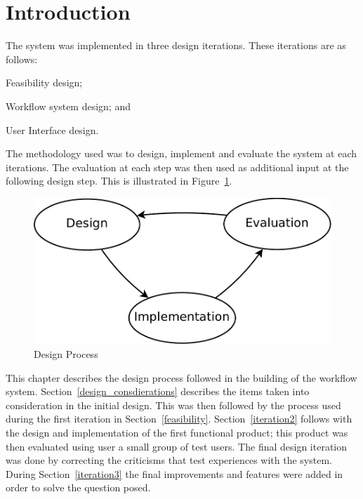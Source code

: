 \documentclass[12pt,a4paper]{report}
\begin{document}
\section{Introduction}
The  system was implemented in three design iterations. These iterations are
as follows: \begin{inparaenum}[(i)] \item Feasibility design;
\item Workflow system design; and \item User Interface design.
\end{inparaenum} The methodology used was to design, implement
and evaluate the system at each iterations. The evaluation at
each step was then used as additional input at the following
design step. This is illustrated in Figure~\ref{design_figure}.

\begin{figure}[!h]
\begin{center}
\includegraphics[scale=0.5]{figures/design_cycle.pdf}
\end{center}
\caption{Design Process}
\label{design_figure}
\end{figure}

\noindent This chapter describes the design process followed in the building
of the workflow system. Section~\ref{design_consdierations} describes
the items taken into consideration in the initial design. This was then
followed by the process used during the first iteration in Section~\ref{feasibility}.
Section~\ref{iteration2} follows with the design and implementation of the
first functional product; this product was then evaluated using user a small
group of test users.
The final design iteration was done by correcting the criticisms that test
experiences with the system. During Section~\ref{iteration3} the final
improvements and features were added in order to solve the question posed.
\end{document}
